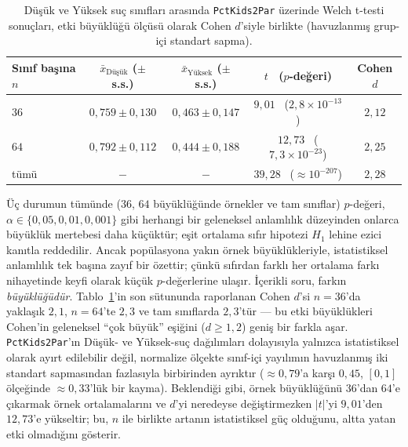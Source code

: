 \documentclass{ieeeaccess}
\begin{document}
\begin{table}[!t]
\caption{Düşük ve Yüksek suç sınıfları arasında \texttt{PctKids2Par} üzerinde Welch t-testi sonuçları, etki büyüklüğü ölçüsü olarak Cohen $d$'siyle birlikte (havuzlanmış grup-içi standart sapma).}
\label{tab:ttest}
\centering
\begin{tabular}{lcccc}
\toprule
Sınıf başına $n$ & $\bar x_{\text{Düşük}}$ ($\pm$ s.s.) & $\bar x_{\text{Yüksek}}$ ($\pm$ s.s.) & $t$ \ ($p$-değeri) & Cohen $d$ \\
\midrule
$36$ & $0{,}759\pm 0{,}130$ & $0{,}463\pm 0{,}147$ & $9{,}01$ \ ($2{,}8\!\times\!10^{-13}$) & $2{,}12$ \\
$64$ & $0{,}792\pm 0{,}112$ & $0{,}444\pm 0{,}188$ & $12{,}73$ \ ($7{,}3\!\times\!10^{-23}$) & $2{,}25$ \\
tümü & $-$              & $-$              & $39{,}28$ \ ($\approx 10^{-207}$)    & $2{,}28$ \\
\bottomrule
\end{tabular}
\end{table}

Üç durumun tümünde ($36$, $64$ büyüklüğünde örnekler ve tam sınıflar) $p$-değeri, $\alpha\in\{0{,}05, 0{,}01, 0{,}001\}$ gibi herhangi bir geleneksel anlamlılık düzeyinden onlarca büyüklük mertebesi daha küçüktür; eşit ortalama sıfır hipotezi $H_1$ lehine ezici kanıtla reddedilir. Ancak popülasyona yakın örnek büyüklükleriyle, istatistiksel anlamlılık tek başına zayıf bir özettir; çünkü sıfırdan farklı her ortalama farkı nihayetinde keyfi olarak küçük $p$-değerlerine ulaşır. İçerikli soru, farkın \emph{büyüklüğüdür}. Tablo~\ref{tab:ttest}'in son sütununda raporlanan Cohen $d$'si $n=36$'da yaklaşık $2{,}1$, $n=64$'te $2{,}3$ ve tam sınıflarda $2{,}3$'tür --- bu etki büyüklükleri Cohen'in geleneksel ``çok büyük'' eşiğini ($d\!\geq\!1{,}2$) geniş bir farkla aşar. \texttt{PctKids2Par}'ın Düşük- ve Yüksek-suç dağılımları dolayısıyla yalnızca istatistiksel olarak ayırt edilebilir değil, normalize ölçekte sınıf-içi yayılımın havuzlanmış iki standart sapmasından fazlasıyla birbirinden ayrıktır ($\approx 0{,}79$'a karşı $0{,}45$, $[0,1]$ ölçeğinde $\approx 0{,}33$'lük bir kayma). Beklendiği gibi, örnek büyüklüğünü $36$'dan $64$'e çıkarmak örnek ortalamalarını ve $d$'yi neredeyse değiştirmezken $|t|$'yi $9{,}01$'den $12{,}73$'e yükseltir; bu, $n$ ile birlikte artanın istatistiksel güç olduğunu, altta yatan etki olmadığını gösterir.
\end{document}
